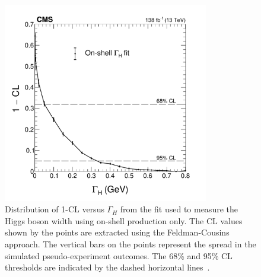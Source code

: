 \begin{figure}[!htb]
  \centering
  \includegraphics[width=0.8\textwidth]{figures/Figure_010.pdf}
  \caption{Distribution of 1-CL versus $\Gamma_H$ from the fit used to measure the Higgs boson width using on-shell production only. The CL values shown by the points are extracted using the Feldman-Cousins approach. The vertical bars on the points represent the spread in the simulated pseudo-experiment outcomes. The 68\% and 95\% CL thresholds are indicated by the dashed horizontal lines~\cite{PhysRevD.111.092014}.}
  \label{OnShell_width}
\end{figure}
